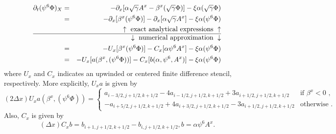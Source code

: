 \documentclass[showpacs,amsmath,amssymb,prd]{revtex4}
\newcommand{\beq}{\begin{equation}}
\newcommand{\eeq}{\end{equation}}
\newcommand{\beqn}{\begin{eqnarray}}
\newcommand{\eeqn}{\end{eqnarray}}
\begin{document}
\beqn
\partial_t (\psi^6 \Phi)_X
&=& - \partial_x [\alpha \sqrt{\gamma} A^x -
\beta^x (\sqrt{\gamma} \Phi)] - \xi \alpha (\sqrt{\gamma} \Phi) \\
&=& - \partial_x [\beta^x (\psi^6\Phi)]
- \partial_x [\alpha \sqrt{\gamma} A^x]
- \xi \alpha (\psi^6\Phi) \\
&& \uparrow \text{ exact analytical expressions } \uparrow \nonumber \\
\hline
&& \downarrow \text{ numerical approximation } \downarrow \nonumber \\
&=& 
- U_x [\beta^x (\psi^6\Phi)]
- C_x [\alpha \psi^6 A^x]
- \xi \alpha (\psi^6\Phi) \\
&=& 
- U_x [a(\beta^x,(\psi^6\Phi))]
- C_x [b(\alpha,\psi^6,A^x)]
- \xi \alpha (\psi^6\Phi) \\
\eeqn
where $U_x$ and $C_x$ indicates an upwinded or centered finite
difference stencil, respectively. More explicitly, $U_x a$ is given by
\beq 
(2 \Delta x) U_x a(\beta^x,(\psi^6\Phi)) = \left\{ \begin{array}{ll}
  a_{i-3/2,j+1/2,k+1/2} - 4 a_{i-1/2,j+1/2,k+1/2} + 3 a_{i+1/2,j+1/2,k+1/2} & \mbox{if $\beta^x < 0$\ ,} \\
  -a_{i+5/2,j+1/2,k+1/2} + 4 a_{i+3/2,j+1/2,k+1/2}- 3 a_{i+1/2,j+1/2,k+1/2} & \mbox{otherwise\ .}
\label{psi6phi_firstterm}
\end{array} \right .
\eeq
Also, $C_x$ is given by
\beq
(\Delta x) C_x b = b_{i+1,j+1/2,k+1/2} - b_{i,j+1/2,k+1/2}, b=\alpha \psi^6 A^x.
\label{psi6phi_secondterm}
\eeq
\end{document}
